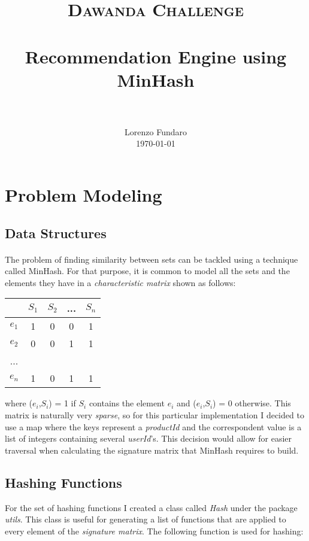 \documentclass[paper=a4, fontsize=11pt]{scrartcl}
\title{
		\usefont{OT1}{bch}{b}{n}
		\normalfont \normalsize \textsc{Dawanda Challenge} \\ [25pt]
		\horrule{0.5pt} \\[0.4cm]
		\huge Recommendation Engine using MinHash \\
		\horrule{2pt} \\[0.5cm]
}
\author{
		\normalfont 								\normalsize
        Lorenzo Fundaro\\[-3pt]		\normalsize
        \today
}
\date{}
\numberwithin{equation}{section}		%
\numberwithin{figure}{section}			%
\numberwithin{table}{section}				%
\begin{document}
\maketitle

\section{Problem Modeling}
\subsection{Data Structures}
\paragraph{}
The problem of finding similarity between sets can be tackled using a technique called MinHash. For that purpose, it is common 
to model all the sets and the elements they have in a \textit{characteristic matrix} shown as follows:

\begin{table}[h]
\centering
\begin{tabular}{|c|c|c|c|c|}
\hline
      & $S_1$ & $S_2$ & ... & $S_n$ \\ \hline
$e_1$ & 1     & 0     & 0   & 1     \\ \hline
$e_2$ & 0     & 0     & 1   & 1     \\ \hline
...   &       &       &     &       \\ \hline
$e_n$   & 1     & 0     & 1   & 1     \\ \hline
\end{tabular}
\end{table}

where ($e_i$,$S_i$) = 1 if $S_i$ contains the element $e_i$ and ($e_i$,$S_i$) = 0 otherwise. This matrix is naturally very \textit{sparse}, so for 
this particular implementation I decided to use a map where the keys represent a \textit{productId} and the correspondent value is a list of integers containing several 
\textit{userId}'s. This decision would allow for easier traversal when calculating the signature matrix that MinHash requires to build.

\subsection{Hashing Functions}

For the set of hashing functions I created a class called \textit{Hash} under the package \textit{utils}.
This class is useful for generating a list of functions that are applied to every element of the \textit{signature matrix}. The following 
function is used for hashing:
\end{document}
